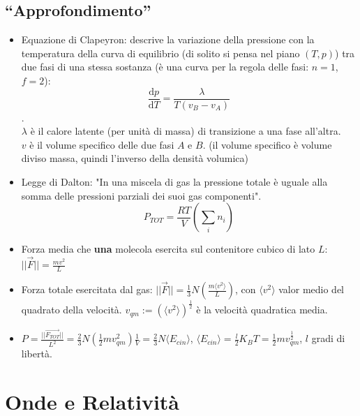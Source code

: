 \documentclass[10pt,a4paper]{article}
\newcommand{\de}{{\ensuremath{ \mbox{d}}}}
\newcommand{\norm}[1]{{\ensuremath{||{#1}||}}}
\newcommand{\ang}[1]{{\ensuremath{\langle {#1}\rangle}}}
\begin{document}
\begin{multicols}{2}
  \subsection*{``Approfondimento''}
  \begin{itemize}
  \item Equazione di Clapeyron: descrive la variazione della pressione con la temperatura della curva di equilibrio (di solito si pensa nel piano $(T,p)$) tra due fasi di una stessa sostanza (è una curva per la regola delle fasi: $n=1$, $f=2$): $$\frac{\de p}{\de T} =\frac{\lambda}{T (v_B - v_A)}$$. \\
  $\lambda$ è il calore latente (per unità di massa) di transizione a una fase all'altra. \\
  $v$ è il volume specifico delle due fasi $A$ e $B$. (il volume specifico è volume diviso massa, quindi l'inverso della densità volumica)
  \item Legge di Dalton: "In una miscela di gas la pressione totale \`e uguale alla somma delle pressioni parziali dei suoi gas componenti". $$P_{TOT} = \frac{RT}{V}\left( \sum_{i} n_i \right)$$
  \item Forza media che {\bf una} molecola esercita sul contenitore cubico di lato $L$: $\norm{\vec{F}} = \frac{mv^2}{L}$
  \item Forza totale esercitata dal gas: $\norm{\vec{F}} = \frac{1}{3}N \left(\frac{m \ang{v^2}}{L} \right)$, con $\ang{v^2}$ valor medio del quadrato della velocit\`a. $v_{qm} := (\ang{v^2})^{\frac{1}{2}}$ \`e la velocit\`a quadratica media.
  \item $P = \frac{\norm{\vec{F_{TOT}}}}{L^2} = \frac{2}{3} N \left(\frac{1}{2}m {v_{qm}^{2}} \right) \frac{1}{V} = \frac{2}{3} N \ang{E_{cin}}$, $\ang{E_{cin}} = \frac{l}{2}K_BT = \frac{1}{2}m{v_{qm}^\frac{1}{2}}$, $l$ gradi di libert\`a.
  \end{itemize}

  \clearpage
  
  \section{Onde e Relatività}

\end{multicols}
\end{document}
